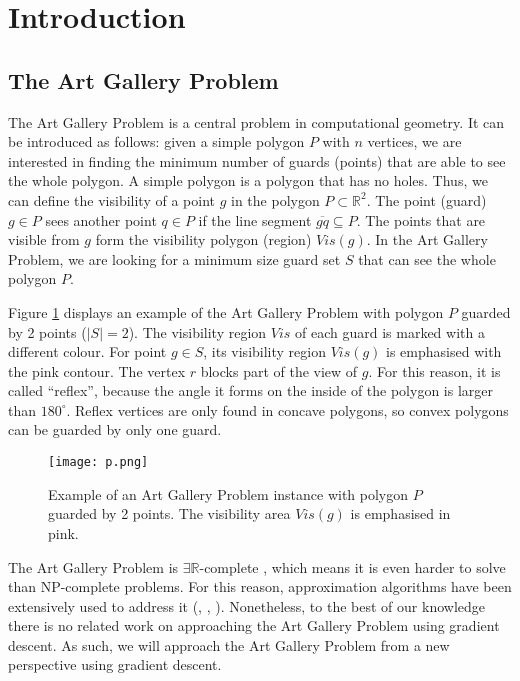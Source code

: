 \section{Introduction}
\subsection{The Art Gallery Problem}

The Art Gallery Problem \cite{o1987art} is a central problem in computational geometry. It can be introduced as follows: given a simple polygon $P$ with $n$ vertices, we are interested in finding the minimum number of guards (points) that are able to see the whole polygon. A simple polygon is a polygon that has no holes. Thus, we can define the visibility of a point $g$ in the polygon $P \subset \mathbb R^2$. The point (guard) $g \in P$ sees another point $q \in P$ if the line segment $\overline{gq} \subseteq P$. The points that are visible from $g$ form the visibility polygon (region) $\mathit{Vis}(g)$. In the Art Gallery Problem, we are looking for a minimum size guard set $S$ that can see the whole polygon $P$.

Figure \ref{fig:art} displays an example of the Art Gallery Problem \cite{o1987art} with polygon $P$ guarded by 2 points ($|S| = 2$). The visibility region $\mathit{Vis}$ of each guard is marked with a different colour. For point $g \in S$, its visibility region $\mathit{Vis}(g)$ is emphasised with the pink contour. The vertex $r$ blocks part of the view of $g$. For this reason, it is called ``reflex'', because the angle it forms on the inside of the polygon is larger than $180^\circ$. Reflex vertices are only found in concave polygons, so convex polygons can be guarded by only one guard.

\begin{figure}[h!]
    \centering
    \texttt{[image: p.png]}
    \caption{Example of an Art Gallery Problem instance with polygon $P$ guarded by 2 points. The visibility area $\mathit{Vis}(g)$ is emphasised in pink.}
    \label{fig:art}
\end{figure}

The Art Gallery Problem \cite{o1987art} is $\exists \mathbb R$-complete \cite{abrahamsen2021art}, which means it is even harder to solve than NP-complete problems. For this reason, approximation algorithms have been extensively used to address it (\cite{DBLP:journals/corr/BonnetM16b}, \cite{GHOSH2010718}, \cite{DBLP:journals/corr/abs-2007-06920}). Nonetheless, to the best of our knowledge there is no related work on approaching the Art Gallery Problem \cite{o1987art} using gradient descent. As such, we will approach the Art Gallery Problem \cite{o1987art} from a new perspective using gradient descent.

